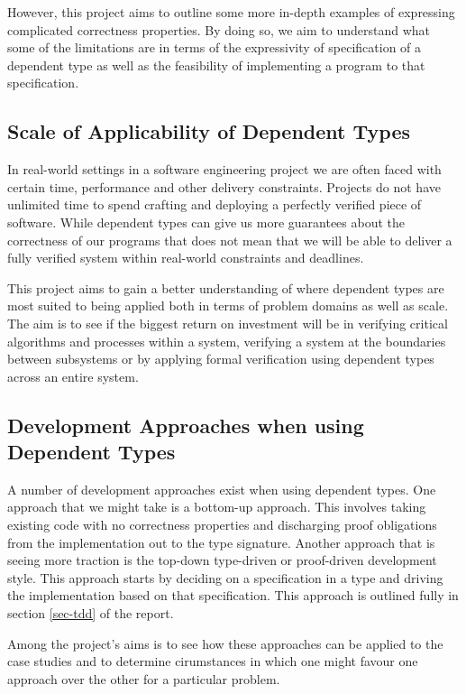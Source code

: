 \documentclass[a4paper, notitlepage]{report}
\begin{document}
However, this project aims to outline some more in-depth examples of expressing
complicated correctness properties. By doing so, we aim to understand what some
of the limitations are in terms of the expressivity of specification of a
dependent type as well as the feasibility of implementing a program to that
specification.

\subsection{Scale of Applicability of Dependent Types}
\label{sec:orgd85fd19}
In real-world settings in a software engineering project we are often faced with
certain time, performance and other delivery constraints. Projects do not have
unlimited time to spend crafting and deploying a perfectly verified piece of
software. While dependent types can give us more guarantees about the
correctness of our programs that does not mean that we will be able to deliver a
fully verified system within real-world constraints and deadlines.

This project aims to gain a better understanding of where dependent types are
most suited to being applied both in terms of problem domains as well as scale.
The aim is to see if the biggest return on investment will be in verifying
critical algorithms and processes within a system, verifying a system at the
boundaries between subsystems or by applying formal verification using dependent
types across an entire system.

\subsection{Development Approaches when using Dependent Types}
\label{sec:orgaee8bab}
A number of development approaches exist when using dependent types. One
approach that we might take is a bottom-up approach. This involves taking
existing code with no correctness properties and discharging proof obligations
from the implementation out to the type signature. Another approach that is
seeing more traction is the top-down type-driven or proof-driven development
style. This approach starts by deciding on a specification in a type and driving
the implementation based on that specification. This approach is outlined fully
in section \ref{sec-tdd} of the report.

Among the project's aims is to see how these approaches can be applied to the
case studies and to determine cirumstances in which one might favour one
approach over the other for a particular problem.
\end{document}
